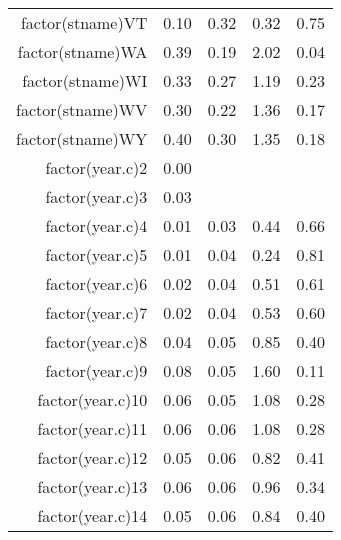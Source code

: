 \begin{table}[ht]
\begin{tabular}{rrrrr}
  factor(stname)VT & 0.10 & 0.32 & 0.32 & 0.75 \\ 
  factor(stname)WA & 0.39 & 0.19 & 2.02 & 0.04 \\ 
  factor(stname)WI & 0.33 & 0.27 & 1.19 & 0.23 \\ 
  factor(stname)WV & 0.30 & 0.22 & 1.36 & 0.17 \\ 
  factor(stname)WY & 0.40 & 0.30 & 1.35 & 0.18 \\ 
  factor(year.c)2 & 0.00 &  &  &  \\ 
  factor(year.c)3 & 0.03 &  &  &  \\ 
  factor(year.c)4 & 0.01 & 0.03 & 0.44 & 0.66 \\ 
  factor(year.c)5 & 0.01 & 0.04 & 0.24 & 0.81 \\ 
  factor(year.c)6 & 0.02 & 0.04 & 0.51 & 0.61 \\ 
  factor(year.c)7 & 0.02 & 0.04 & 0.53 & 0.60 \\ 
  factor(year.c)8 & 0.04 & 0.05 & 0.85 & 0.40 \\ 
  factor(year.c)9 & 0.08 & 0.05 & 1.60 & 0.11 \\ 
  factor(year.c)10 & 0.06 & 0.05 & 1.08 & 0.28 \\ 
  factor(year.c)11 & 0.06 & 0.06 & 1.08 & 0.28 \\ 
  factor(year.c)12 & 0.05 & 0.06 & 0.82 & 0.41 \\ 
  factor(year.c)13 & 0.06 & 0.06 & 0.96 & 0.34 \\ 
  factor(year.c)14 & 0.05 & 0.06 & 0.84 & 0.40 \\ 
   \hline
\end{tabular}
\end{table}
